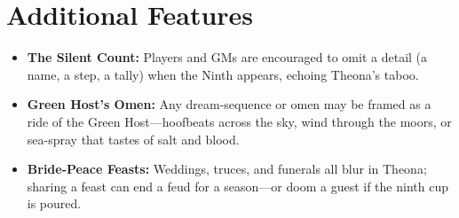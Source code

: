 \section*{Additional Features}
\begin{itemize}
\item \textbf{The Silent Count:} Players and GMs are encouraged to omit a detail (a name, a step, a tally) when the Ninth appears, echoing Theona's taboo.
\item \textbf{Green Host’s Omen:} Any dream-sequence or omen may be framed as a ride of the Green Host---hoofbeats across the sky, wind through the moors, or sea-spray that tastes of salt and blood.
\item \textbf{Bride-Peace Feasts:} Weddings, truces, and funerals all blur in Theona; sharing a feast can end a feud for a season---or doom a guest if the ninth cup is poured.
\end{itemize}